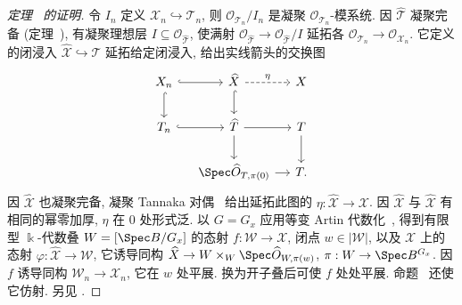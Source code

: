 \begin{proof}[定理~ 的证明]
令 $I_n$ 定义 $\mathcal X_n\hookrightarrow\mathcal T_n$, 则 $\mathcal O_{\mathcal T_n}/I_n$ 是凝聚 $\mathcal O_{\mathcal T_n}$-模系统. 因 $\widehat{\mathcal T}$ 凝聚完备 (定理~), 有凝聚理想层 $I\subseteq\mathcal O_{\widehat{\mathcal T}}$, 使满射 $\mathcal O_{\widehat{\mathcal T}}\to\mathcal O_{\widehat{\mathcal T}}/I$ 延拓各 $\mathcal O_{\mathcal T_n}\to\mathcal O_{\mathcal X_n}$. 它定义的闭浸入 $\widehat{\mathcal X}\hookrightarrow\widehat{\mathcal T}$ 延拓给定闭浸入, 给出实线箭头的交换图
\begin{align*}
\begin{tikzcd}[ampersand replacement=\&,column sep=small]
\mathcal X_n\arrow[r,hook]\arrow[d,hook]\&\widehat{\mathcal X}\arrow[d,hook]\arrow[r,dashed,"{\eta}"]\&\mathcal X\\
\mathcal T_n\arrow[r,hook]\&\widehat{\mathcal T}\arrow[r]\arrow[d]\&\mathcal T\arrow[d]\\
\&\Spec\widehat{\mathcal O}_{T,\pi(0)}\arrow[r]\&T.
\end{tikzcd}
\end{align*}
因 $\widehat{\mathcal X}$ 也凝聚完备, 凝聚 Tannaka 对偶~ 给出延拓此图的 $\eta:\widehat{\mathcal X}\to\mathcal X$. 因 $\widehat{\mathcal X}$ 与 $\widehat{\mathcal X}$ 有相同的幂零加厚, $\eta$ 在 $0$ 处形式泛. 以 $G=G_x$ 应用等变 Artin 代数化~, 得到有限型 $\Bbbk$-代数叠 $\mathcal W=[\Spec B/G_x]$ 的态射 $f:\mathcal W\to\mathcal X$, 闭点 $w\in|\mathcal W|$, 以及 $\mathcal X$ 上的态射 $\varphi:\widehat{\mathcal X}\to\mathcal W$, 它诱导同构 $\widehat{\mathcal X}\to\mathcal W\times_W\Spec\widehat{\mathcal O}_{W,\pi(w)}$, $\pi:\mathcal W\to\Spec B^{G_x}$. 因 $f$ 诱导同构 $\mathcal W_n\to\mathcal X_n$, 它在 $w$ 处平展. 换为开子叠后可使 $f$ 处处平展. 命题~ 还使它仿射. 另见 \cite{AHR20,AHR19,AHHLR24}.
\end{proof}


